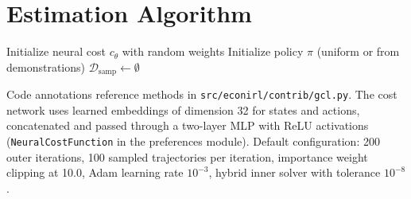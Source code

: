 \documentclass[11pt]{article}
\begin{document}
\section{Estimation Algorithm}

\begin{algorithm}[H]
\DontPrintSemicolon
\caption{Guided Cost Learning (Finn, Levine, and Abbeel 2016)}
\label{alg:gcl}
Initialize neural cost $c_\theta$ with random weights
Initialize policy $\pi$ (uniform or from demonstrations)\;
$\mathcal{D}_{\text{samp}} \leftarrow \emptyset$\;
\BlankLine
{}
\end{algorithm}

Code annotations reference methods in \texttt{src/econirl/contrib/gcl.py}.
The cost network uses learned embeddings of dimension 32 for states and actions, concatenated and passed through a two-layer MLP with ReLU activations (\texttt{NeuralCostFunction} in the preferences module).
Default configuration: 200 outer iterations, 100 sampled trajectories per iteration, importance weight clipping at 10.0, Adam learning rate $10^{-3}$, hybrid inner solver with tolerance $10^{-8}$.
\end{document}
